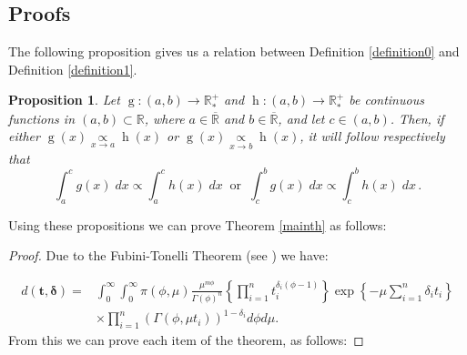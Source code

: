 \documentclass[]{interact}
\newcommand{\f}{\operatorname}
\theoremstyle{plain}%
\newtheorem{proposition}[theorem]{Proposition}
\theoremstyle{definition}
\theoremstyle{remark}
\begin{document}
\begin{appendix}    

\section{Proofs}

The following proposition gives us a relation between Definition \ref{definition0} and Definition \ref{definition1}.

\begin{proposition}\label{proportional2} Let $\f{g}:(a,b)\to\mathbb{R^+_*}$ and $\f{h}:(a,b)\to\mathbb{R^+_*}$ be continuous functions in $(a,b)\subset\mathbb{R}$, where $a\in\overline{\mathbb{R}}$ and $b\in\overline{\mathbb{R}}$, and let $c\in(a,b)$. Then, if either $\f{g}(x)\underset{x\to a}{\propto} \f{h}(x)$ or $\f{g}(x)\underset{x\to b}{\propto} \f{h}(x)$, it will follow respectively that
\begin{equation*}
\int_a^c g(x)\; dx \propto \int_a^c h(x)\; dx\ \mbox{ or }\ \int_c^b g(x)\; dx \propto \int_c^b h(x)\; dx \,.
\end{equation*}
\end{proposition} 

Using these propositions we can prove Theorem \ref{mainth} as follows:

\begin{proof} Due to the Fubini-Tonelli Theorem (see \cite{folland}) we have:

\begin{align*}%
d(\boldsymbol{t,\delta})=&\int_{0}^{\infty}\int_{0}^{\infty}\pi(\phi,\mu)\frac{\mu^{m\phi}}{\Gamma(\phi)^n}\left\{\prod_{i=1}^n{t_i^{\delta_i(\phi-1)}}\right\}\exp\left\{-\mu\sum_{i=1}^n {\delta_i}t_i\right\}\nonumber \\
&\times \prod_{i=1}^n\left(\Gamma(\phi,\mu t_i)\right)^{1-\delta_i}d\phi d\mu.
\end{align*}
From this we can prove each item of the theorem, as follows:


\end{proof}
\end{appendix}
\end{document}
